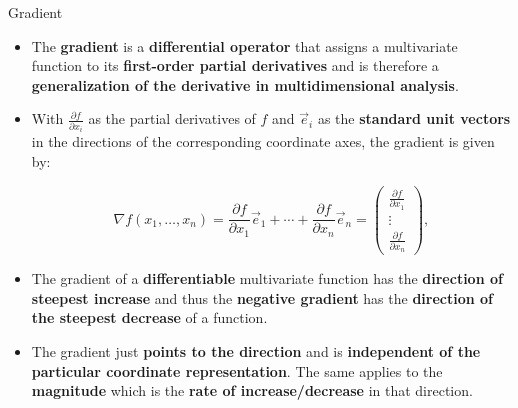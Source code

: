 \documentclass[main.tex]{subfiles}
\begin{document}
    \begin{frame}{Gradient}
        \begin{itemize}
            \item The \textbf{gradient} is a \textbf{differential operator} that assigns a multivariate function to its \textbf{first-order partial derivatives} and is therefore a \textbf{generalization of the derivative in multidimensional analysis}.
            \item With $\frac{\partial f}{\partial x_i}$ as the partial derivatives of $f$ and $\vec{e}_i$ as the \textbf{standard unit vectors} in the directions of the corresponding coordinate axes, the gradient is given by:
            
            $$\nabla f(x_1, \dots, x_n) = \frac{\partial f}{\partial x_1} \vec{e}_1 + \cdots + \frac{\partial f}{\partial x_n} \vec{e}_n = \begin{pmatrix}\frac{\partial f}{\partial x_{1}} \\ \vdots \\  \frac{\partial f}{\partial x_{n}} \end{pmatrix},$$
            
            \item The gradient of a \textbf{differentiable} multivariate function has the \textbf{direction of steepest increase} and thus the \textbf{negative gradient} has the \textbf{direction of the steepest decrease} of a function.
            \item The gradient just \textbf{points to the direction} and is \textbf{independent of the particular coordinate representation}. The same applies to the \textbf{magnitude} which is the \textbf{rate of increase/decrease} in that direction.
        \end{itemize}
    \end{frame}
\end{document}
